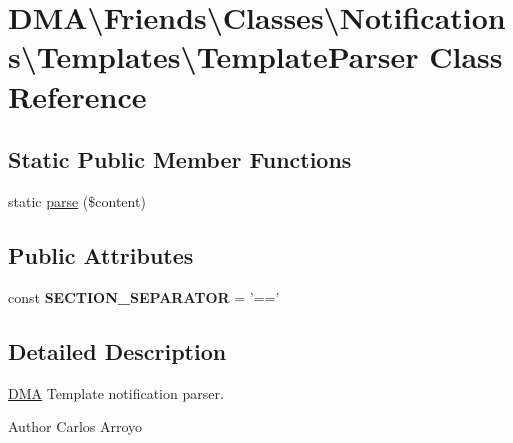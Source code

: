 \hypertarget{classDMA_1_1Friends_1_1Classes_1_1Notifications_1_1Templates_1_1TemplateParser}{\section{D\+M\+A\textbackslash{}Friends\textbackslash{}Classes\textbackslash{}Notifications\textbackslash{}Templates\textbackslash{}Template\+Parser Class Reference}
\label{classDMA_1_1Friends_1_1Classes_1_1Notifications_1_1Templates_1_1TemplateParser}
}
\subsection*{Static Public Member Functions}
\begin{DoxyCompactItemize}
\item 
static \hyperlink{classDMA_1_1Friends_1_1Classes_1_1Notifications_1_1Templates_1_1TemplateParser_a9979e7218aa198939d99e9ebbc654327}{parse} (\$content)
\end{DoxyCompactItemize}
\subsection*{Public Attributes}
\begin{DoxyCompactItemize}
\item 
\hypertarget{classDMA_1_1Friends_1_1Classes_1_1Notifications_1_1Templates_1_1TemplateParser_a0671a5759e44ca9e4bb5db9796682f74}{const {\bfseries S\+E\+C\+T\+I\+O\+N\+\_\+\+S\+E\+P\+A\+R\+A\+T\+O\+R} = '=='}\label{classDMA_1_1Friends_1_1Classes_1_1Notifications_1_1Templates_1_1TemplateParser_a0671a5759e44ca9e4bb5db9796682f74}

\end{DoxyCompactItemize}


\subsection{Detailed Description}
\hyperlink{namespaceDMA}{D\+M\+A} Template notification parser. \begin{DoxyAuthor}{Author}
Carlos Arroyo 
\end{DoxyAuthor}


